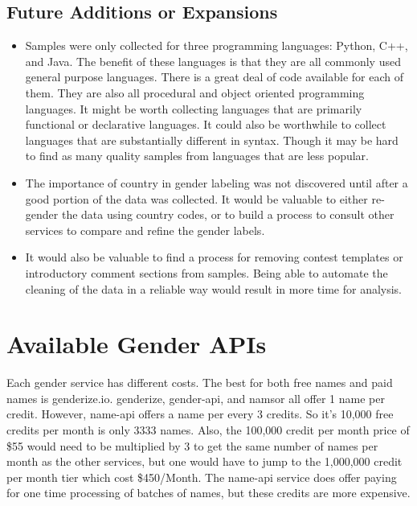 \documentclass[12pt]{article}
\begin{document}
\subsection{Future Additions or Expansions}
\begin{itemize}
    \item Samples were only collected for three programming languages: Python, C++, and Java. The benefit of these languages is that they are all commonly used general purpose languages. There is a great deal of code available for each of them. They are also all procedural and object oriented programming languages. It might be worth collecting languages that are primarily functional or declarative languages. It could also be worthwhile to collect languages that are substantially different in syntax. Though it may be hard to find as many quality samples from languages that are less popular.
    \item The importance of country in gender labeling was not discovered until after a good portion of the data was collected. It would be valuable to either re-gender the data using country codes, or to build a process to consult other services to compare and refine the gender labels.
    \item It would also be valuable to find a process for removing contest templates or introductory comment sections from samples. Being able to automate the cleaning of the data in a reliable way would result in more time for analysis.
\end{itemize}


\newpage





\newpage
\appendix

\section{Available Gender APIs}

Each gender service has different costs. The best for both free names and paid names is genderize.io. genderize, gender-api, and namsor all offer 1 name per credit. However, name-api offers a name per every 3 credits. So it's 10,000 free credits per month is only 3333 names. Also, the 100,000 credit per month price of \$55 would need to be multiplied by 3 to get the same number of names per month as the other services, but one would have to jump to the 1,000,000 credit per month tier which cost \$450/Month. The name-api service does offer paying for one time processing of batches of names, but these credits are more expensive.
\end{document}
